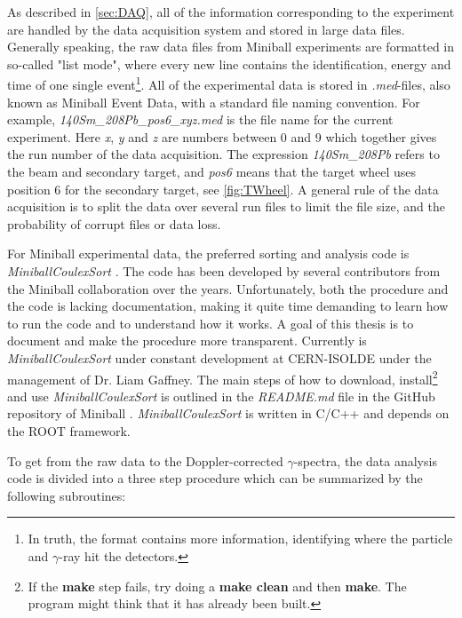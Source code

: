 \documentclass[twoside,english]{uiofysmaster/uiofysmaster}
\newcommand{\ga}{$\gamma$}
\let\orgautoref\autoref
\renewcommand{\autoref}
        {%
		 \def\sectionautorefname{Section}%
		 \def\subsectionautorefname{Section}%
		 \def\subsubsectionautorefname{Section}%
		 \def\chapterautorefname{Chapter}%
          \orgautoref}
\begin{document}
As described in \autoref{sec:DAQ}, all of the information corresponding to the experiment are handled by the data acquisition system and stored in large data files. 
Generally speaking, the raw data files from Miniball experiments are formatted in so-called "list mode", where every new line contains the identification, energy and time of one single event\footnote{In truth, the format contains more information, identifying where the particle and \ga-ray hit the detectors.}.
All of the experimental data is stored in \textit{.med}-files, also known as Miniball Event Data, with a standard file naming convention. 
For example, \textit{140Sm\_208Pb\_pos6\_xyz.med} is the file name for the current experiment. 
Here \textit{x}, \textit{y} and \textit{z} are numbers between 0 and 9 which together gives the run number of the data acquisition. 
The expression \textit{140Sm\_208Pb} refers to the beam and secondary target, and \textit{pos6} means that the target wheel uses position 6 for the secondary target, see \autoref{fig:TWheel}.
A general rule of the data acquisition is to split the data over several run files to limit the file size, and the probability of corrupt files or data loss.

For Miniball experimental data, the preferred sorting and analysis code is \textsl{MiniballCoulexSort} \cite{MBCS}.
The code has been developed by several contributors from the Miniball collaboration over the years. 
Unfortunately, both the procedure and the code is lacking documentation, making it quite time demanding to learn how to run the code and to understand how it works.
A goal of this thesis is to document and make the procedure more transparent.
Currently is \textsl{MiniballCoulexSort} under constant development at CERN-ISOLDE under the management of Dr. Liam Gaffney. 
The main steps of how to download, install\footnote{If the \textbf{make} step fails, try doing a \textbf{make clean} and then \textbf{make}. The program might think that it has already been built.} and use \textsl{MiniballCoulexSort} is outlined in the \textit{README.md} file in the GitHub repository of Miniball \cite{MBCS}. 
\textsl{MiniballCoulexSort} is written in C/C++ and depends on the ROOT framework. 

To get from the raw data to the Doppler-corrected \ga-spectra, the data analysis code is divided into a three step procedure which can be summarized by the following subroutines:
\end{document}
